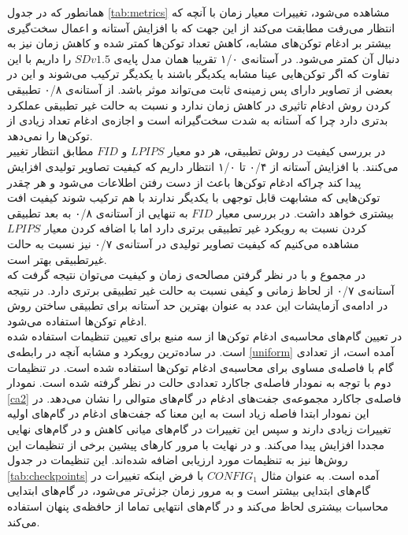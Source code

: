  همانطور که در جدول \ref{tab:metrics} مشاهده می‌شود، تغییرات معیار زمان با آنچه که انتظار می‌رفت مطابقت می‌کند از این جهت که با افزایش آستانه و اعمال سخت‌گیری بیشتر بر ادغام توکن‌های مشابه، کاهش تعداد توکن‌ها کمتر شده و کاهش زمان نیز به دنبال آن کمتر می‌شود. در آستانه‌ی ۱/۰ تقریبا همان مدل پایه‌ی $SD v1.5$ را داریم با این تفاوت که اگر توکن‌هایی عینا مشابه یکدیگر باشند با یکدیگر ترکیب می‌شوند و این در بعضی از تصاویر دارای پس زمینه‌ی ثابت می‌تواند موثر باشد. از آستانه‌ی ۰/۸ تطبیقی کردن روش ادغام تاثیری در کاهش زمان ندارد و نسبت به حالت غیر تطبیقی عملکرد بدتری دارد چرا که آستانه به شدت سخت‌گیرانه ‌است و اجازه‌ی ادغام تعداد زیادی از توکن‌ها را نمی‌دهد.
 \\
 در بررسی کیفیت در روش تطبیقی، هر دو معیار $LPIPS$ و $FID$ مطابق انتظار تغییر می‌کنند. با افزایش آستانه از ۰/۴ تا ۱/۰ انتظار داریم که کیفیت تصاویر تولیدی افزایش پیدا کند چراکه ادغام توکن‌ها باعث از دست رفتن اطلاعات می‌شود و هر چقدر توکن‌هایی که مشابهت قابل توجهی با یکدیگر ندارند با هم ترکیب شوند کیفیت افت بیشتری خواهد داشت. در بررسی معیار $FID$ به تنهایی از آستانه‌ی ۰/۸ به بعد تطبیقی کردن نسبت به رویکرد غیر تطبیقی برتری دارد اما با اضافه کردن معیار $LPIPS$ مشاهده می‌کنیم که کیفیت تصاویر تولیدی در آستانه‌ی ۰/۷ نیز نسبت به حالت غیرتطبیقی بهتر است.
 \\
 در مجموع و با در نظر گرفتن مصالحه‌ی زمان و کیفیت می‌توان نتیجه گرفت که آستانه‌ی ۰/۷ از لحاظ زمانی و کیفی نسبت به حالت غیر تطبیقی برتری دارد. در نتیجه در ادامه‌ی آزمایشات این عدد به عنوان بهترین حد آستانه برای تطبیقی‌ ساختن روش ادغام توکن‌ها استفاده می‌شود.
 \\
 در تعیین گام‌های محاسبه‌ی ادغام توکن‌ها از سه منبع برای تعیین تنظیمات استفاده شده است. در ساده‌ترین رویکرد و مشابه آنچه در رابطه‌ی \ref{uniform} آمده است، از تعدادی گام با فاصله‌ی مساوی برای محاسبه‌ی ادغام توکن‌ها استفاده شده است. در تنظیمات دوم با توجه به نمودار فاصله‌ی جاکارد تعدادی حالت در نظر گرفته شده است. نمودار \ref{ca2} فاصله‌ی جاکارد مجموعه‌‌ی جفت‌های ادغام در گام‌های متوالی را نشان می‌دهد. در این نمودار ابتدا فاصله زیاد است به این معنا که جفت‌های ادغام در گام‌های اولیه تغییرات زیادی دارند و سپس این تغییرات در گام‌های میانی کاهش و در گام‌های نهایی مجددا افزایش پیدا می‌کند. و در نهایت با مرور کار‌های پیشین \cite{ma2024deepcache}\cite{li2023faster} برخی از تنظیمات این روش‌ها نیز به تنظیمات مورد ارزیابی اضافه شده‌اند. این تنظیمات در جدول \ref{tab:checkpoints} آمده است. به عنوان مثال $CONFIG_1$ با فرض اینکه تغییرات در گام‌های ابتدایی بیشتر است و به مرور زمان جزئی‌تر می‌شود، در گام‌های ابتدایی محاسبات بیشتری لحاظ می‌کند و در گام‌های انتهایی تماما از حافظه‌ی پنهان استفاده می‌کند.

